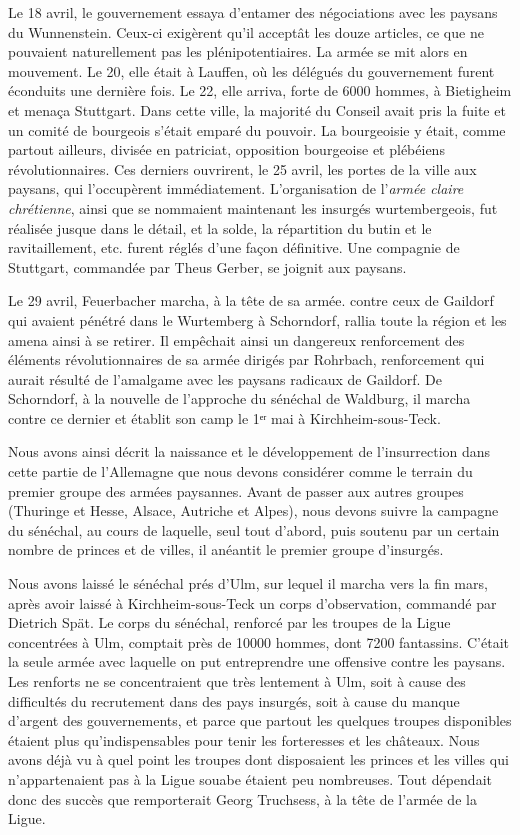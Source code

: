 \documentclass[french,twoside]{book} %
\begin{document}
Le 18 avril, le gouvernement essaya d’entamer des négociations avec les paysans du Wunnenstein. Ceux-ci exigèrent qu’il acceptât les douze articles, ce que ne pouvaient naturellement pas les plénipotentiaires. La armée se mit alors en mouvement. Le 20, elle était à Lauffen, où les délégués du gouvernement furent éconduits une dernière fois. Le 22, elle arriva, forte de 6000 hommes, à Bietigheim et menaça Stuttgart. Dans cette ville, la majorité du Conseil avait pris la fuite et un comité de bourgeois s’était emparé du pouvoir. La bourgeoisie y était, comme partout ailleurs, divisée en patriciat, opposition bourgeoise et plébéiens révolutionnaires. Ces derniers ouvrirent, le 25 avril, les portes de la ville aux paysans, qui l’occupèrent immédiatement. L’organisation de l’\emph{armée claire chrétienne}, ainsi que se nommaient maintenant les insurgés wurtembergeois, fut réalisée jusque dans le détail, et la solde, la répartition du butin et le ravitaillement, etc. furent réglés d’une façon définitive. Une compagnie de Stuttgart, commandée par Theus Gerber, se joignit aux paysans.\par
Le 29 avril, Feuerbacher marcha, à la tête de sa armée. contre ceux de Gaildorf qui avaient pénétré dans le Wurtemberg à Schorndorf, rallia toute la région et les amena ainsi à se retirer. Il empêchait ainsi un dangereux renforcement des éléments révolutionnaires de sa armée dirigés par Rohrbach, renforcement qui aurait résulté de l’amalgame avec les paysans radicaux de Gaildorf. De Schorndorf, à la nouvelle de l’approche du sénéchal de Waldburg, il marcha contre ce dernier et établit son camp le 1ᵉʳ mai à Kirchheim-sous-Teck.\par
Nous avons ainsi décrit la naissance et le développement de l’insurrection dans cette partie de l’Allemagne que nous devons considérer comme le terrain du premier groupe des armées paysannes. Avant de passer aux autres groupes (Thuringe et Hesse, Alsace, Autriche et Alpes), nous devons suivre la campagne du sénéchal, au cours de laquelle, seul tout d’abord, puis soutenu par un certain nombre de princes et de villes, il anéantit le premier groupe d’insurgés.\par
Nous avons laissé le sénéchal prés d’Ulm, sur lequel il marcha vers la fin mars, après avoir laissé à Kirchheim-sous-Teck un corps d’observation, commandé par Dietrich Spät. Le corps du sénéchal, renforcé par les troupes de la Ligue concentrées à Ulm, comptait près de 10000 hommes, dont 7200 fantassins. C’était la seule armée avec laquelle on put entreprendre une offensive contre les paysans. Les renforts ne se concentraient que très lentement à Ulm, soit à cause des difficultés du recrutement dans des pays insurgés, soit à cause du manque d’argent des gouvernements, et parce que partout les quelques troupes disponibles étaient plus qu’indispensables pour tenir les forteresses et les châteaux. Nous avons déjà vu à quel point les troupes dont disposaient les princes et les villes qui n’appartenaient pas à la Ligue souabe étaient peu nombreuses. Tout dépendait donc des succès que remporterait Georg Truchsess, à la tête de l’armée de la Ligue.\par
\end{document}
